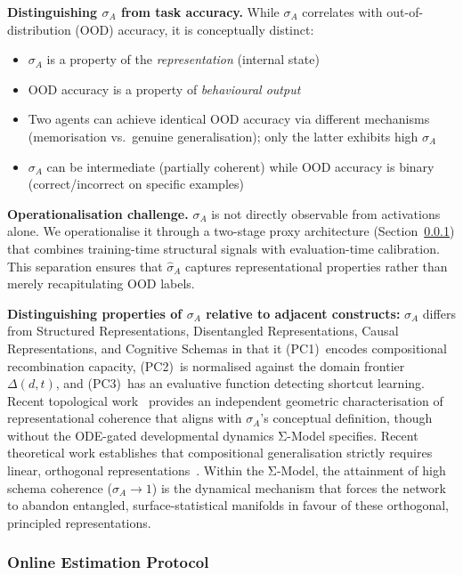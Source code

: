 \documentclass[10pt]{article}
\begin{document}
\textbf{Distinguishing $\sigma_A$ from task accuracy.} While $\sigma_A$
correlates with out-of-distribution (OOD) accuracy, it is conceptually
distinct:
\begin{itemize}[nosep]
\item $\sigma_A$ is a property of the \textit{representation} (internal state)
\item OOD accuracy is a property of \textit{behavioural output}
\item Two agents can achieve identical OOD accuracy via different mechanisms (memorisation vs.\ genuine generalisation); only the latter exhibits high $\sigma_A$
\item $\sigma_A$ can be intermediate (partially coherent) while OOD accuracy is binary (correct/incorrect on specific examples)
\end{itemize}

\textbf{Operationalisation challenge.} $\sigma_A$ is not directly
observable from activations alone. We operationalise it through a
two-stage proxy architecture (Section~\ref{sec:online-estimation}) that
combines training-time structural signals with evaluation-time
calibration. This separation ensures that $\hat{\sigma}_A$ captures
representational properties rather than merely recapitulating OOD labels.

\textbf{Distinguishing properties of $\sigma_A$ relative to adjacent
constructs:} $\sigma_A$ differs from Structured Representations, Disentangled
Representations, Causal Representations, and Cognitive Schemas in that it (PC1)~encodes compositional
recombination capacity, (PC2)~is normalised against the domain frontier
$\Delta(d,t)$, and (PC3)~has an evaluative function detecting shortcut learning.
Recent topological work~\cite{gaukstad2026learningcoherent} provides an
independent geometric characterisation of representational coherence that
aligns with $\sigma_A$'s conceptual definition, though without the
ODE-gated developmental dynamics Σ-Model specifies. Recent theoretical work
establishes that compositional generalisation strictly requires linear,
orthogonal representations~\cite{uselis2026linear}. Within the Σ-Model, the
attainment of high schema coherence ($\sigma_A \to 1$) is the dynamical
mechanism that forces the network to abandon entangled, surface-statistical
manifolds in favour of these orthogonal, principled representations.

\subsubsection{Online Estimation Protocol}\label{sec:online-estimation}
\end{document}
